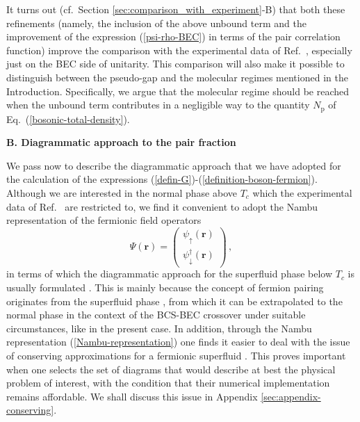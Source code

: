 \documentclass[pra,twocolumn,aps,amssymb,showpacs,superscriptaddress]{revtex4-1}
\begin{document}
It turns out (cf.~Section \ref{sec:comparison_with_experiment}-B) that both these refinements (namely, the inclusion of the above unbound term and the improvement of the expression (\ref{psi-rho-BEC}) in terms of the pair correlation function) improve the comparison with the experimental data of Ref.~\cite{Ulm-Cam-2019}, especially just on the BEC side of unitarity.
This comparison will also make it possible to distinguish between the pseudo-gap and the molecular regimes mentioned in the Introduction. Specifically, we argue that the molecular regime should be reached when the unbound term contributes in a negligible way to the quantity $N_{\mathrm{p}}$ of Eq.~(\ref{bosonic-total-density}).
 
\vspace{0.05cm}
\begin{center}
{\bf B. Diagrammatic approach to the pair fraction}
\end{center}

We pass now to describe the diagrammatic approach that we have adopted for the calculation of the expressions (\ref{defin-G})-(\ref{definition-boson-fermion}).
Although we are interested in the normal phase above $T_{c}$ which the experimental data of Ref.~\cite{Ulm-Cam-2019} are restricted to, we find it convenient to adopt the Nambu representation of the fermionic field operators
\begin{equation} 
\Psi({\mathbf r})  =  \left( \begin{array}{c}
                              \psi_{\uparrow}({\mathbf r}) \\
                              \psi_{\downarrow}^{\dagger}({\mathbf r}) 
                              \end{array} \right) \, ,
\label{Nambu-representation}
\end{equation}
in terms of which the diagrammatic approach for the superfluid phase below $T_{c}$ is usually formulated \cite{Schrieffer-1964}.
This is mainly because the concept of fermion pairing originates from the superfluid phase \cite{BCS-1957}, from which it can be extrapolated to the normal phase in the context of the BCS-BEC crossover \cite{Physics-Reports-2018} under suitable circumstances, like in the present case.
In addition, through the Nambu representation (\ref{Nambu-representation}) one finds it easier to deal with the issue of conserving approximations for a fermionic superfluid \cite{Baym-1962}. 
This proves important when one selects the set of diagrams that would describe at best the physical problem of interest, with the condition that their numerical implementation remains affordable.
We shall discuss this issue in Appendix \ref{sec:appendix-conserving}.
\end{document}
